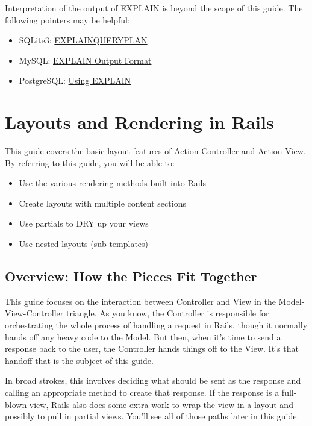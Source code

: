 \documentclass[10pt]{book}
\begin{document}
Interpretation of the output of EXPLAIN is beyond the scope of this guide. The following pointers may be helpful:
\begin{itemize}
	\item SQLite3: \href{http://www.sqlite.org/eqp.html}{EXPLAINQUERYPLAN}
\end{itemize}
\begin{itemize}
	\item MySQL: \href{http://dev.mysql.com/doc/refman/5.6/en/explain-output.html}{EXPLAIN Output Format}
\end{itemize}
\begin{itemize}
	\item PostgreSQL: \href{http://www.postgresql.org/docs/current/static/using-explain.html}{Using EXPLAIN}
\end{itemize}

\chapter{Layouts and Rendering in Rails}

This guide covers the basic layout features of Action Controller and  Action View. By referring to this guide, you will be able to:
\begin{itemize}
	\item Use the various rendering methods built into Rails
	\item Create layouts with multiple content sections
	\item Use partials to DRY up your views
	\item Use nested layouts (sub-templates)
\end{itemize}

\section{ Overview: How the Pieces Fit Together}

This guide focuses on the interaction between Controller and View in  the Model-View-Controller triangle. As you know, the Controller is  responsible for orchestrating the whole process of handling a request in  Rails, though it normally hands off any heavy code to the Model. But  then, when it’s time to send a response back to the user, the Controller  hands things off to the View. It’s that handoff that is the subject of  this guide.

In broad strokes, this involves deciding what should be sent as the  response and calling an appropriate method to create that response. If  the response is a full-blown view, Rails also does some extra work to  wrap the view in a layout and possibly to pull in partial views. You’ll  see all of those paths later in this guide.
\end{document}
